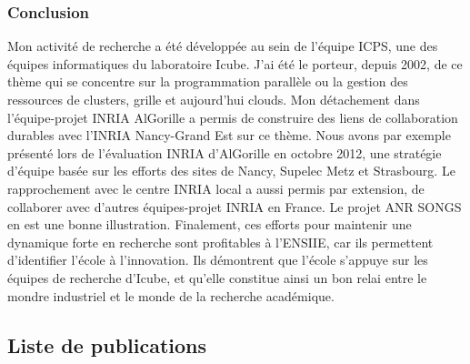 \documentclass[11pt]{article}
\begin{document}
\subsubsection{Conclusion}

Mon activité  de recherche a  été développée au sein  de l'équipe ICPS,  une des
équipes informatiques du laboratoire Icube. J'ai été le porteur, depuis 2002, de
ce  thème qui  se concentre  sur la  programmation parallèle  ou la  gestion des
ressources  de clusters,  grille et  aujourd'hui clouds.   Mon détachement  dans
l'équipe-projet  INRIA   AlGorille  a   permis  de   construire  des   liens  de
collaboration durables avec l'INRIA Nancy-Grand Est sur ce thème. Nous avons par
exemple présenté  lors de  l'évaluation INRIA d'AlGorille  en octobre  2012, une
stratégie d'équipe  basée sur les  efforts des sites  de Nancy, Supelec  Metz et
Strasbourg.  Le  rapprochement avec  le centre  INRIA local  a aussi  permis par
extension, de collaborer avec d'autres équipes-projet INRIA en France. Le projet
ANR SONGS en est une bonne  illustration. Finalement, ces efforts pour maintenir
une dynamique forte en recherche sont profitables à l'ENSIIE, car ils permettent
d'identifier l'école à l'innovation. Ils démontrent que l'école s'appuye sur les
équipes de recherche  d'Icube, et qu'elle constitue  ainsi un bon relai
entre le mondre industriel et le monde de la recherche académique. 

 



\subsectionfont{\sectionrule{3ex}{0pt}{-1ex}{0pt}}



\newpage
\subsection{Liste de publications}
\end{document}
